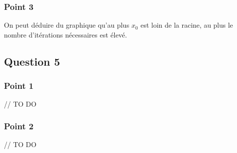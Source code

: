 \subsubsection{Point 3}

On peut déduire du graphique qu'au plus $x_0$ est loin de la racine, au plus le nombre d'itérations nécessaires est élevé.

\subsection{Question 5}

\subsubsection{Point 1}

// TO DO

\subsubsection{Point 2}

// TO DO